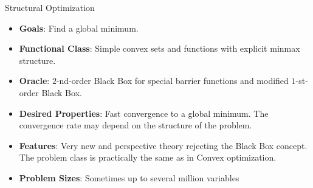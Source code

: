 \begin{colorboxnote}{Structural Optimization}
    \begin{itemize}
        \item \textbf{Goals}: Find a global minimum.
        \item \textbf{Functional Class}: Simple convex sets and functions with explicit minmax structure.
        \item \textbf{Oracle}: \(2\)-nd-order Black Box for special barrier functions and modified \(1\)-st-order Black Box.
        \item \textbf{Desired Properties}: Fast convergence to a global minimum. The convergence rate may depend on the structure of the problem.
        \item \textbf{Features}: Very new and perspective theory rejecting the Black Box concept. The problem class is practically the same as in Convex optimization.
        \item \textbf{Problem Sizes}: Sometimes up to several million variables
    \end{itemize}
\end{colorboxnote}

